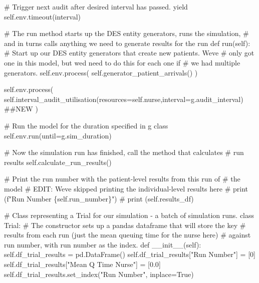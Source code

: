 \documentclass[
  letterpaper,
  DIV=11,
  numbers=noendperiod]{scrreprt}
\newenvironment{Shaded}{\begin{snugshade}}{\end{snugshade}}
\newcommand{\CommentTok}[1]{\textcolor[rgb]{0.37,0.37,0.37}{#1}}
\newcommand{\ControlFlowTok}[1]{\textcolor[rgb]{0.00,0.23,0.31}{#1}}
\newcommand{\DecValTok}[1]{\textcolor[rgb]{0.68,0.00,0.00}{#1}}
\newcommand{\FloatTok}[1]{\textcolor[rgb]{0.68,0.00,0.00}{#1}}
\newcommand{\FunctionTok}[1]{\textcolor[rgb]{0.28,0.35,0.67}{#1}}
\newcommand{\KeywordTok}[1]{\textcolor[rgb]{0.00,0.23,0.31}{#1}}
\newcommand{\NormalTok}[1]{\textcolor[rgb]{0.00,0.23,0.31}{#1}}
\newcommand{\OperatorTok}[1]{\textcolor[rgb]{0.37,0.37,0.37}{#1}}
\newcommand{\StringTok}[1]{\textcolor[rgb]{0.13,0.47,0.30}{#1}}
\newcommand{\VariableTok}[1]{\textcolor[rgb]{0.07,0.07,0.07}{#1}}
\begin{document}
\begin{tcolorbox}
\begin{Shaded}
\begin{Highlighting}[]
            \CommentTok{\# Trigger next audit after desired interval has passed.}
            \ControlFlowTok{yield} \VariableTok{self}\NormalTok{.env.timeout(interval)}

    \CommentTok{\# The run method starts up the DES entity generators, runs the simulation,}
    \CommentTok{\# and in turns calls anything we need to generate results for the run}
    \KeywordTok{def}\NormalTok{ run(}\VariableTok{self}\NormalTok{):}
        \CommentTok{\# Start up our DES entity generators that create new patients.  We\textquotesingle{}ve}
        \CommentTok{\# only got one in this model, but we\textquotesingle{}d need to do this for each one if}
        \CommentTok{\# we had multiple generators.}
        \VariableTok{self}\NormalTok{.env.process(}
          \VariableTok{self}\NormalTok{.generator\_patient\_arrivals()}
\NormalTok{        )}

        \VariableTok{self}\NormalTok{.env.process(}
          \VariableTok{self}\NormalTok{.interval\_audit\_utilisation(resources}\OperatorTok{=}\VariableTok{self}\NormalTok{.nurse,interval}\OperatorTok{=}\NormalTok{g.audit\_interval) }\CommentTok{\#\#NEW}
\NormalTok{        )}

        \CommentTok{\# Run the model for the duration specified in g class}
        \VariableTok{self}\NormalTok{.env.run(until}\OperatorTok{=}\NormalTok{g.sim\_duration)}

        \CommentTok{\# Now the simulation run has finished, call the method that calculates}
        \CommentTok{\# run results}
        \VariableTok{self}\NormalTok{.calculate\_run\_results()}

        \CommentTok{\# Print the run number with the patient{-}level results from this run of}
        \CommentTok{\# the model}
        \CommentTok{\# EDIT: We\textquotesingle{}ve skipped printing the individual{-}level results here}
        \CommentTok{\# print (f"Run Number \{self.run\_number\}")}
        \CommentTok{\# print (self.results\_df)}


\CommentTok{\# Class representing a Trial for our simulation {-} a batch of simulation runs.}
\KeywordTok{class}\NormalTok{ Trial:}
    \CommentTok{\# The constructor sets up a pandas dataframe that will store the key}
    \CommentTok{\# results from each run (just the mean queuing time for the nurse here)}
    \CommentTok{\# against run number, with run number as the index.}
    \KeywordTok{def}  \FunctionTok{\_\_init\_\_}\NormalTok{(}\VariableTok{self}\NormalTok{):}
        \VariableTok{self}\NormalTok{.df\_trial\_results }\OperatorTok{=}\NormalTok{ pd.DataFrame()}
        \VariableTok{self}\NormalTok{.df\_trial\_results[}\StringTok{"Run Number"}\NormalTok{] }\OperatorTok{=}\NormalTok{ [}\DecValTok{0}\NormalTok{]}
        \VariableTok{self}\NormalTok{.df\_trial\_results[}\StringTok{"Mean Q Time Nurse"}\NormalTok{] }\OperatorTok{=}\NormalTok{ [}\FloatTok{0.0}\NormalTok{]}
        \VariableTok{self}\NormalTok{.df\_trial\_results.set\_index(}\StringTok{"Run Number"}\NormalTok{, inplace}\OperatorTok{=}\VariableTok{True}\NormalTok{)}


\end{Highlighting}
\end{Shaded}
\end{tcolorbox}
\end{document}
